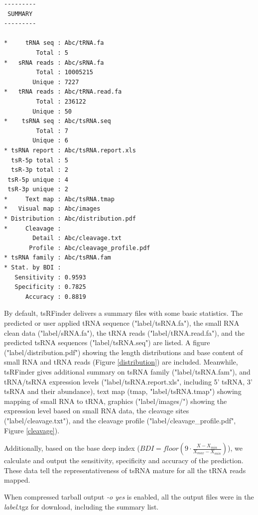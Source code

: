 \documentclass[11pt, a4paper]{article}
\begin{document}
{\footnotesize \begin{tcolorbox}[colback=blue!5!white,colframe=pink!75!black,title=tsRFinder demo output list]
\begin{verbatim}
---------
 SUMMARY 
---------

*     tRNA seq : Abc/tRNA.fa
         Total : 5
*   sRNA reads : Abc/sRNA.fa
         Total : 10005215
        Unique : 7227
*   tRNA reads : Abc/tRNA.read.fa
         Total : 236122
        Unique : 50
*    tsRNA seq : Abc/tsRNA.seq
         Total : 7
        Unique : 6
* tsRNA report : Abc/tsRNA.report.xls
  tsR-5p total : 5
  tsR-3p total : 2
 tsR-5p unique : 4
 tsR-3p unique : 2
*     Text map : Abc/tsRNA.tmap
*   Visual map : Abc/images
* Distribution : Abc/distribution.pdf
*     Cleavage :
        Detail : Abc/cleavage.txt
       Profile : Abc/cleavage_profile.pdf
* tsRNA family : Abc/tsRNA.fam
* Stat. by BDI :
   Sensitivity : 0.9593
   Specificity : 0.7825
      Accuracy : 0.8819
\end{verbatim}
\end{tcolorbox}}

By default, tsRFinder delivers a summary files with some basic statistics. The predicted or user applied tRNA sequence ("label/tsRNA.fa"), the small RNA clean data ("label/sRNA.fa"), the tRNA reads ("label/tRNA.read.fa"), and the predicted tsRNA sequences ("label/tsRNA.seq") are listed. A figure ("label/distribution.pdf") showing the length distributions and base content of small RNA and tRNA reads (Figure \ref{distribution}) are included. Meanwhile, tsRFinder gives additional summary on tsRNA family ("label/tsRNA.fam"), and tRNA/tsRNA expression levels ("label/tsRNA.report.xls", including 5' tsRNA, 3' tsRNA and their abundance), text map (tmap, "label/tsRNA.tmap") showing mapping of small RNA to tRNA, graphics ("label/images/") showing the expression level based on small RNA data, the cleavage sites ("label/cleavage.txt"), and the cleavage profile ("label/cleavage\_profile.pdf", Figure \ref{cleavage}).

Additionally, based on the base deep index ($ BDI = floor (9 \cdot \frac{X-X_{min}}{X_{max}-X_{min}}) $), we calculate and output the sensitivity, specificity and accuracy of the prediction.  These data tell the representativeness of tsRNA mature for all the tRNA reads mapped.

When compressed tarball output \emph{-o yes} is enabled, all the output files were in the \emph{label}.tgz for download, including the summary list.
\end{document}
